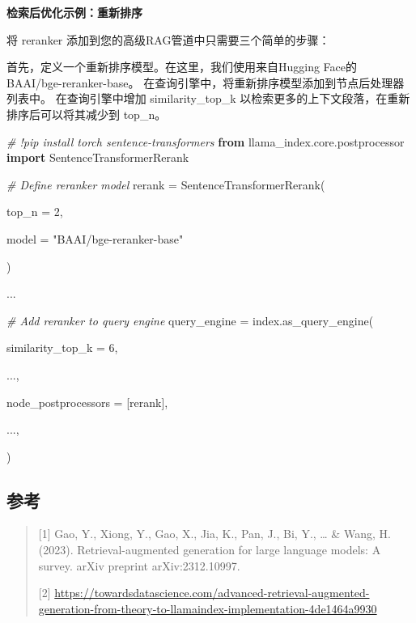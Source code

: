 \documentclass[
]{article}
\newenvironment{Shaded}{}{}
\newcommand{\CommentTok}[1]{\textcolor[rgb]{0.38,0.63,0.69}{\textit{#1}}}
\newcommand{\DecValTok}[1]{\textcolor[rgb]{0.25,0.63,0.44}{#1}}
\newcommand{\ImportTok}[1]{\textcolor[rgb]{0.00,0.50,0.00}{\textbf{#1}}}
\newcommand{\NormalTok}[1]{#1}
\newcommand{\OperatorTok}[1]{\textcolor[rgb]{0.40,0.40,0.40}{#1}}
\newcommand{\StringTok}[1]{\textcolor[rgb]{0.25,0.44,0.63}{#1}}
\begin{document}
\textbf{检索后优化示例：重新排序}

将 reranker 添加到您的高级RAG管道中只需要三个简单的步骤：

首先，定义一个重新排序模型。在这里，我们使用来自Hugging Face的
BAAI/bge-reranker-base。
在查询引擎中，将重新排序模型添加到节点后处理器列表中。 在查询引擎中增加
similarity\_top\_k 以检索更多的上下文段落，在重新排序后可以将其减少到
top\_n。

\begin{Shaded}
\begin{Highlighting}[]
\CommentTok{\# !pip install torch sentence{-}transformers
}
\ImportTok{from}\NormalTok{ llama\_index.core.postprocessor }\ImportTok{import}\NormalTok{ SentenceTransformerRerank
}


\CommentTok{\# Define reranker model
}
\NormalTok{rerank }\OperatorTok{=}\NormalTok{ SentenceTransformerRerank(
}
\NormalTok{    top\_n }\OperatorTok{=} \DecValTok{2}\NormalTok{, 
}
\NormalTok{    model }\OperatorTok{=} \StringTok{"BAAI/bge{-}reranker{-}base"}

\NormalTok{)
}
\NormalTok{...
}
\CommentTok{\# Add reranker to query engine
}
\NormalTok{query\_engine }\OperatorTok{=}\NormalTok{ index.as\_query\_engine(
}
\NormalTok{        similarity\_top\_k }\OperatorTok{=} \DecValTok{6}\NormalTok{,
}
\NormalTok{        ...,
}
\NormalTok{                node\_postprocessors }\OperatorTok{=}\NormalTok{ [rerank],
}
\NormalTok{        ...,
}
\NormalTok{)}
\end{Highlighting}
\end{Shaded}

\subsection{参考}\label{ux53c2ux8003}

\begin{quote}
{[}1{]} Gao, Y., Xiong, Y., Gao, X., Jia, K., Pan, J., Bi, Y., \ldots{}
\& Wang, H. (2023). Retrieval-augmented generation for large language
models: A survey. arXiv preprint arXiv:2312.10997.

{[}2{]}
\url{https://towardsdatascience.com/advanced-retrieval-augmented-generation-from-theory-to-llamaindex-implementation-4de1464a9930}
\end{quote}
\end{document}
